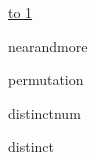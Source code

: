 \documentclass[12pt,a4paper,oneside]{article}
\newcommand{\ProblemLabel}{undefined}
\newcommand{\ProblemTL}{undefined}
\newcommand{\ProblemML}{undefined}
\newcommand{\ProblemName}{undefined}
\def\probl#1#2#3#4#5{
  \renewcommand{\ProblemName}{#2}
  \renewcommand{\ProblemLabel}{#3}
  \renewcommand{\ProblemTL}{#4}
  \renewcommand{\ProblemML}{#5}
  {#2}
}
\begin{document}
\vspace*{-2em}
\tableofcontents

\vspace*{1em}

\noindent \underline{\hbox to 1\textwidth{{ } \hfil{ } \hfil{ } }}

\pagebreak

\probl{2015-07}{nearandmore}{A}{0.5 sec}{256 mb} %
\probl{2011-03}{permutation}{B}{0.5 sec}{256 mb} %
\probl{2015-02}{distinctnum}{C}{0.5 sec}{256 mb} %
\probl{2015-02}{distinct}{D}{0.5 sec}{256 mb}    %
\end{document}

